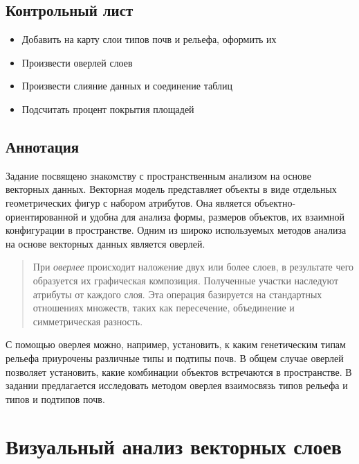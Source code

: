 \documentclass[]{book}
\providecommand{\tightlist}{%
  \setlength{\itemsep}{0pt}\setlength{\parskip}{0pt}}
\theoremstyle{definition}
\theoremstyle{definition}
\theoremstyle{definition}
\theoremstyle{remark}
\begin{document}
\hypertarget{overlay-control}{%
\subsection{Контрольный лист}\label{overlay-control}}

\begin{itemize}
\tightlist
\item
  Добавить на карту слои типов почв и рельефа, оформить их
\item
  Произвести оверлей слоев
\item
  Произвести слияние данных и соединение таблиц
\item
  Подсчитать процент покрытия площадей
\end{itemize}

\hypertarget{overlay-annotation}{%
\subsection{Аннотация}\label{overlay-annotation}}

Задание посвящено знакомству с пространственным анализом на основе
векторных данных. Векторная модель представляет объекты в виде отдельных
геометрических фигур с набором атрибутов. Она является
объектно-ориентированной и удобна для анализа формы, размеров объектов,
их взаимной конфигурации в пространстве. Одним из широко используемых
методов анализа на основе векторных данных является оверлей.

\begin{quote}
При \emph{оверлее} происходит наложение двух или более слоев, в
результате чего образуется их графическая композиция. Полученные участки
наследуют атрибуты от каждого слоя. Эта операция базируется на
стандартных отношениях множеств, таких как пересечение, объединение и
симметрическая разность.
\end{quote}

С помощью оверлея можно, например, установить, к каким генетическим
типам рельефа приурочены различные типы и подтипы почв. В общем случае
оверлей позволяет установить, какие комбинации объектов встречаются в
пространстве. В задании предлагается исследовать методом оверлея
взаимосвязь типов рельефа и типов и подтипов почв.

\hypertarget{overlay-vectors}{%
\section{Визуальный анализ векторных слоев}\label{overlay-vectors}}
\end{document}

